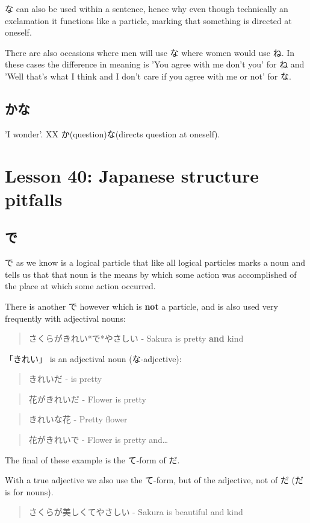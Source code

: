 \documentclass[11pt]{article}
\begin{document}
な can also be used within a sentence, hence why even though technically an exclamation it functions like a particle, marking that something is directed at oneself.

There are also occasions where men will use な where women would use ね. In these cases the difference in meaning is 'You agree with me don't you' for ね and 'Well that's what I think and I don't care if you agree with me or not' for な.

\subsection{かな}
\label{sec:org1a6551b}
'I wonder'. XX か(question)な(directs question at oneself).

\section{Lesson 40: Japanese structure pitfalls}
\label{sec:orgcdd8340}
\subsection{で}
\label{sec:org2968316}
で as we know is a logical particle that like all logical particles marks a noun and tells us that that noun is the means by which some action was accomplished of the place at which some action occurred.

There is another で however which is \textbf{not} a particle, and is also used very frequently with adjectival nouns:
\begin{quote}
さくらがきれい*で*やさしい - Sakura is pretty \textbf{and} kind
\end{quote}
「きれい」 is an adjectival noun (な-adjective):
\begin{quote}
きれいだ - is pretty
\end{quote}
\begin{quote}
花がきれいだ - Flower is pretty
\end{quote}
\begin{quote}
きれいな花 - Pretty flower
\end{quote}
\begin{quote}
花がきれいで - Flower is pretty and\ldots{}
\end{quote}
The final of these example is the て-form of だ.

With a true adjective we also use the て-form, but of the adjective, not of だ (だ is for nouns).
\begin{quote}
さくらが美しくてやさしい - Sakura is beautiful and kind
\end{quote}
\end{document}
